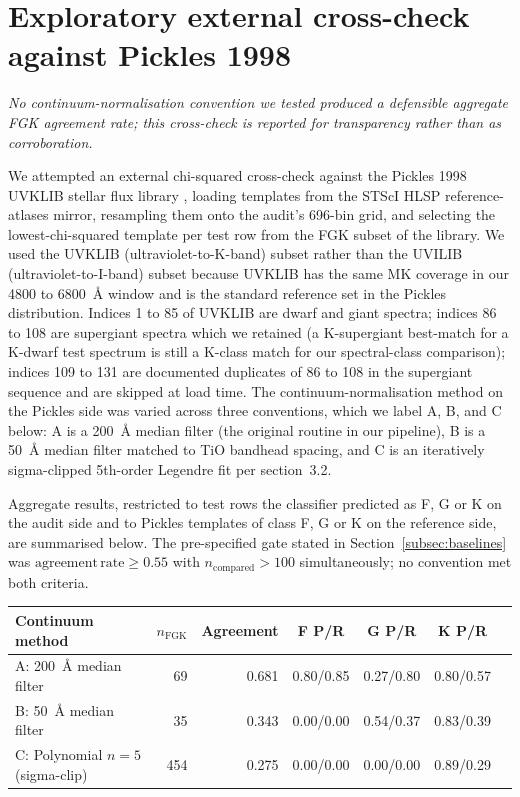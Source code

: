 \documentclass[11pt,a4paper]{article}
\begin{document}



\appendix

\section{Exploratory external cross-check against Pickles 1998}
\label{app:pickles}

\noindent\emph{No continuum-normalisation convention we tested produced a defensible aggregate FGK agreement rate; this cross-check is reported for transparency rather than as corroboration.}

We attempted an external chi-squared cross-check against the Pickles 1998 UVKLIB stellar flux library \citep{1998PASP..110..863P}, loading templates from the STScI HLSP reference-atlases mirror, resampling them onto the audit's 696-bin grid, and selecting the lowest-chi-squared template per test row from the FGK subset of the library. We used the UVKLIB (ultraviolet-to-K-band) subset rather than the UVILIB (ultraviolet-to-I-band) subset because UVKLIB has the same MK coverage in our 4800 to 6800~\AA{} window and is the standard reference set in the Pickles distribution. Indices 1 to 85 of UVKLIB are dwarf and giant spectra; indices 86 to 108 are supergiant spectra which we retained (a K-supergiant best-match for a K-dwarf test spectrum is still a K-class match for our spectral-class comparison); indices 109 to 131 are documented duplicates of 86 to 108 in the supergiant sequence \citep[Table~2]{1998PASP..110..863P} and are skipped at load time. The continuum-normalisation method on the Pickles side was varied across three conventions, which we label A, B, and C below: A is a 200~\AA{} median filter (the original routine in our pipeline), B is a 50~\AA{} median filter matched to TiO bandhead spacing, and C is an iteratively sigma-clipped 5th-order Legendre fit per \citet{1998PASP..110..863P} section~3.2.

Aggregate results, restricted to test rows the classifier predicted as F, G or K on the audit side and to Pickles templates of class F, G or K on the reference side, are summarised below. The pre-specified gate stated in Section~\ref{subsec:baselines} was $\mathrm{agreement\,rate} \geq 0.55$ with $n_{\mathrm{compared}} > 100$ simultaneously; no convention met both criteria.

\begin{center}
\begin{tabular}{lrrcccc}
\toprule
Continuum method & $n_{\mathrm{FGK}}$ & Agreement & F P/R & G P/R & K P/R \\
\midrule
A: 200~\AA{} median filter        &  69 & 0.681 & 0.80/0.85 & 0.27/0.80 & 0.80/0.57 \\
B: 50~\AA{} median filter         &  35 & 0.343 & 0.00/0.00 & 0.54/0.37 & 0.83/0.39 \\
C: Polynomial $n=5$ (sigma-clip)  & 454 & 0.275 & 0.00/0.00 & 0.00/0.00 & 0.89/0.29 \\
\bottomrule
\end{tabular}
\end{center}
\end{document}
